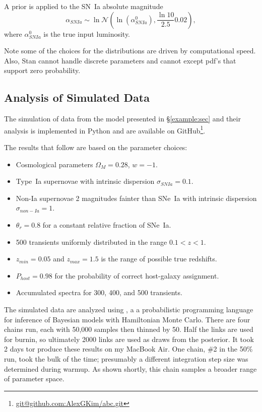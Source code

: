\documentclass[preprint]{aastex}
\begin{document}
A prior is applied to the SN~Ia absolute magnitude
\begin{equation}
\alpha_{SNIa} \sim \ln\mathcal{N}\left(\ln\left(\alpha^0_{SNIa}\right),\frac{\ln{10}}{2.5}0.02\right),
\end{equation}
where $\alpha^0_{SNIa}$ is the true input luminosity.

Note some of the choices for the distributions are driven by computational
speed. 
Also, Stan cannot handle discrete parameters and
cannot except pdf's that support zero probability.

\subsection{Analysis of Simulated Data}
The simulation of data from the model presented in \S\ref{example:sec}
and their analysis is implemented in Python and are available
on GitHub\footnote{\url{git@github.com:AlexGKim/abc.git}}.

The results that follow are based on the parameter
choices:
\begin{itemize}
\item Cosmological parameters $\Omega_M=0.28$, $w=-1$.
\item Type~Ia supernovae with intrinsic dispersion $\sigma_{SNIa}=0.1$.
\item Non-Ia supernovae 2 magnitudes fainter than SNe~Ia with intrinsic
dispersion $\sigma_{non-Ia}=1$.
\item $\theta_r=0.8$ for a constant relative fraction of SNe~Ia.
\item 500 transients uniformly distributed in the range $0.1<z<1$.
\item $z_{min}=0.05$ and $z_{max}=1.5$ is the range of possible true redshifts.
\item $P_{host}=0.98$ for the probability of correct host-galaxy assignment.
\item Accumulated spectra for 300, 400, and 500 transients.
\end{itemize}

The simulated data are analyzed using 
\citet{stan-software:2015}, a
a probabilistic programming language for
inference of Bayesian models with Hamiltonian Monte Carlo.  There are
four chains run, each with 50,000 samples then thinned by 50.  Half the links
are used for burnin, so ultimately 2000 links are used as draws from the posterior.
It took 2 days tor produce these results on my MacBook Air.  One chain, \#2
in the 50\% run,  took the bulk of the time; presumably a different integration step size
was determined during warmup.  As shown shortly, this chain samples
a broader range of parameter space.
\end{document}
